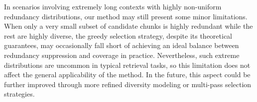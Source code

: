 \documentclass[11pt]{article}
\begin{document}
In scenarios involving extremely long contexts with highly non-uniform redundancy distributions, our method may still present some minor limitations. When only a very small subset of candidate chunks is highly redundant while the rest are highly diverse, the greedy selection strategy, despite its theoretical guarantees, may occasionally fall short of achieving an ideal balance between redundancy suppression and coverage in practice. Nevertheless, such extreme distributions are uncommon in typical retrieval tasks, so this limitation does not affect the general applicability of the method. In the future, this aspect could be further improved through more refined diversity modeling or multi-pass selection strategies.


%



\appendix
\end{document}
